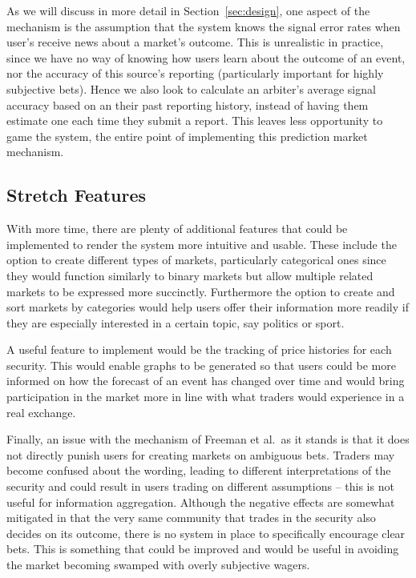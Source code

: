 As we will discuss in more detail in Section~\ref{sec:design}, one aspect of
the mechanism is the assumption that the system knows the signal error rates
when user's receive news about a market's outcome. This is unrealistic in
practice, since we have no way of knowing how users learn about the outcome of
an event, nor the accuracy of this source's reporting (particularly important
for highly subjective bets). Hence we also look to calculate an arbiter's
average signal accuracy based on an their past reporting history, instead of
having them estimate one each time they submit a report. This leaves less
opportunity to game the system, the entire point of implementing this
prediction market mechanism.

\subsection{Stretch Features}

With more time, there are plenty of additional features that could be
implemented to render the system more intuitive and usable. These include the
option to create different types of markets, particularly categorical ones
since they would function similarly to binary markets but allow multiple
related markets to be expressed more succinctly. Furthermore the option to
create and sort markets by categories would help users offer their information
more readily if they are especially interested in a certain topic, say politics
or sport.

A useful feature to implement would be the tracking of price histories for each
security. This would enable graphs to be generated so that users could be more
informed on how the forecast of an event has changed over time and would bring
participation in the market more in line with what traders would experience in
a real exchange.

Finally, an issue with the mechanism of Freeman et al.\ as it stands is that it
does not directly punish users for creating markets on ambiguous bets. Traders
may become confused about the wording, leading to different interpretations of
the security and could result in users trading on different assumptions -- this
is not useful for information aggregation. Although the negative effects are
somewhat mitigated in that the very same community that trades in the security
also decides on its outcome, there is no system in place to specifically
encourage clear bets. This is something that could be improved and would be
useful in avoiding the market becoming swamped with overly subjective wagers.

